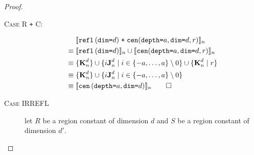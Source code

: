 \begin{proof}
\begin{description}
%
  \item[\textsc{Case R \texttt{+} C}:]
    \begin{align*}
      & \; \interp{\stenReflS{d} \; \texttt{+} \; \stenCenSR{a}{d}{r}}_{n} \\
      \equiv & \; \interp{\stenReflS{d}}_{n} \cup \interp{\stenCenSR{a}{d}{r}}_{n} \\
      \equiv & \; \{\zeroEntry{d}{n}\} \cup
                  \{i\singleEntry{d}{n} \mid i \in \{-a, \ldots, a\}
               \setminus 0 \} \cup
                  \{\zeroEntry{d}{n} \mid r \} \\
      \equiv & \; \{\zeroEntry{d}{n}\} \cup
                  \{i\singleEntry{d}{n} \mid i \in \{-a, \ldots, a\}
               \setminus 0 \} \\
      \equiv & \; \interp{\stenCenS{a}{d}}_n \qed
    \end{align*}
  \item[\textsc{Case IRREFL}]
   let $R$ be a region constant of dimension $d$ and $S$ be a region
   constant of dimension $d'$. \\


\end{description}
\end{proof}
